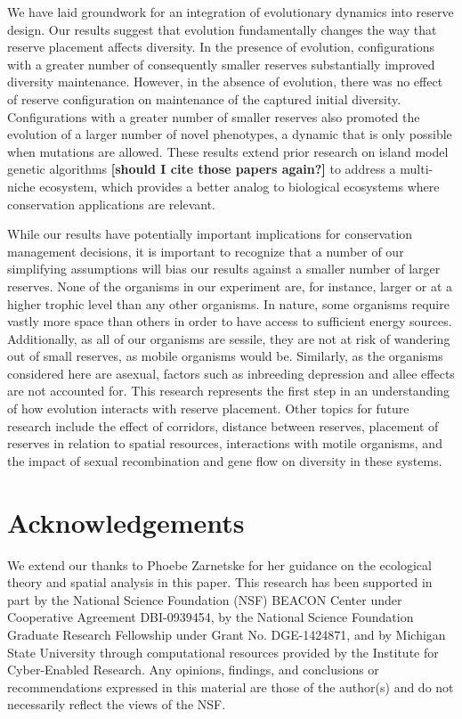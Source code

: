 \documentclass[letterpaper]{article}
\begin{document}
We have laid groundwork for an integration of evolutionary dynamics into reserve design. Our results suggest that evolution fundamentally changes the way that reserve placement affects diversity. In the presence of evolution, configurations with a greater number of consequently smaller reserves substantially improved diversity maintenance. However, in the absence of evolution, there was no effect of reserve configuration on maintenance of the captured initial diversity. Configurations with a greater number of smaller reserves also promoted the evolution of a larger number of novel phenotypes, a dynamic that is only possible when mutations are allowed. These results extend prior research on island model genetic algorithms \textbf{[should I cite those papers again?]} to address a multi-niche ecosystem, which provides a better analog to biological ecosystems where conservation applications are relevant.
    
	While our results have potentially important implications for conservation management decisions, it is important to recognize that a number of our simplifying assumptions will bias our results against a smaller number of larger reserves. None of the organisms in our experiment are, for instance, larger or at a higher trophic level than any other organisms. In nature, some organisms require vastly more space than others in order to have access to sufficient energy sources. Additionally, as all of our organisms are sessile, they are not at risk of wandering out of small reserves, as mobile organisms would be. Similarly, as the organisms considered here are asexual, factors such as inbreeding depression and allee effects are not accounted for. This research represents the first step in an understanding of how evolution interacts with reserve placement. Other topics for future research include the effect of corridors, distance between reserves, placement of reserves in relation to spatial resources, interactions with motile organisms, and the impact of sexual recombination and gene flow on diversity in these systems. 

\section{Acknowledgements}

We extend our thanks to Phoebe Zarnetske for her guidance on the ecological theory and spatial analysis in this paper. This research has been supported in part by the National Science Foundation (NSF) BEACON Center under Cooperative Agreement DBI-0939454, by the National Science Foundation Graduate Research Fellowship under Grant No. DGE-1424871, and by Michigan State University through computational resources provided by the Institute for Cyber-Enabled Research. Any opinions, findings, and conclusions or recommendations expressed in this material are those of the author(s) and do not necessarily reflect the views of the NSF.




\end{document}
